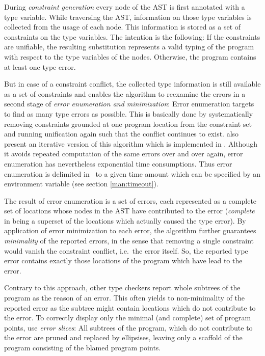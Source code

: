 During \emph{constraint generation} every node of the AST is first annotated
with a type variable. While traversing the AST, information on those type
variables is collected from the usage of each node. This information is stored
as a set of constraints on the type variables.
The intention is the following: If the constraints are unifiable, the resulting
substitution represents a valid typing of the program with respect to the type
variables of the nodes.
Otherwise, the program contains at least one type error.

But in case of a constraint conflict, the collected type information is still
available as a set of constraints and enables the algorithm to reexamine the
errors in a second stage of \emph{error enumeration and minimization}:
Error enumeration targets to find as many type errors as possible.
This is basically done by systematically removing constraints grounded at one
program location from the constraint set and running unification again such
that the conflict continues to exist.
\citet{haackwells04} also present an iterative version of this algorithm which
is implemented in \easyocaml. Although it avoids repeated computation of the
same errors over and over again, error enumeration has nevertheless exponential
time consumptions.
Thus error enumeration is delimited in \easyocaml\ to a given time amount which
can be specified by an environment variable (see section \ref{man:timeout}).

The result of error enumeration is a set of errors, each represented as a
complete set of locations whose nodes in the AST have contributed to the error
(\emph{complete} in being a superset of the locations which actually caused the
type error).
By application of error minimization to each error, the algorithm further
guarantees \emph{minimality} of the reported errors, in the sense that
removing a single constraint would vanish the constraint conflict, i.e.\ the
error itself.  So, the reported type error contains exactly those locations of
the program which have lead to the error.

Contrary to this approach, other type checkers report whole subtrees of the
program as the reason of an error. This often yields to non-minimality of the
reported error as the subtree might contain locations which do not contribute
to the error. To correctly display only the minimal (and complete) set of
program points, \citeauthor{haackwells04} use \emph{error slices}: All subtrees
of the program, which do not contribute to the error are pruned and replaced by
ellipsises, leaving only a scaffold of the program consisting of the blamed
program points.

